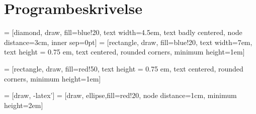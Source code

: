 \section{Programbeskrivelse}
\usetikzlibrary{arrows,calc,positioning}

 = [diamond, draw, fill=blue!20, 
    text width=4.5em, text badly centered, node distance=3cm, inner sep=0pt]
 = [rectangle, draw, fill=blue!20, 
    text width=7em, text height = 0.75 em, text centered, rounded corners, minimum height=1em]

 = [rectangle, draw, fill=red!50, text height = 0.75 em, text centered, rounded corners, minimum height=1em]


 = [draw, -latex']
 = [draw, ellipse,fill=red!20, node distance=1cm,
    minimum height=2em]



